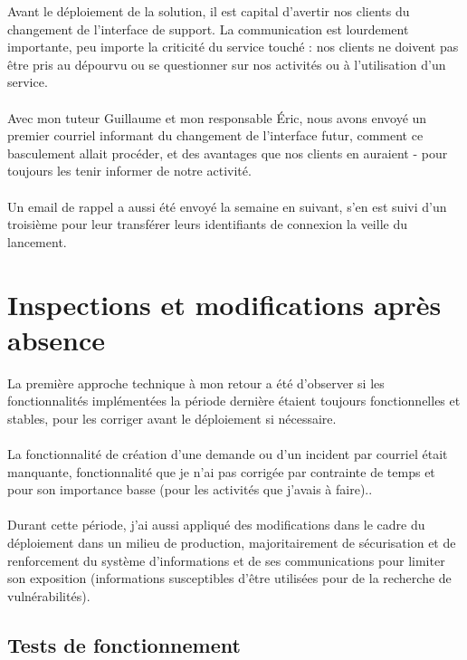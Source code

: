 Avant le déploiement de la solution, il est capital d'avertir nos clients du changement de l'interface de support. La communication est lourdement importante, peu importe la criticité du service touché : nos clients ne doivent pas être pris au dépourvu ou se questionner sur nos activités ou à l'utilisation d'un service.
\\ \\
Avec mon tuteur Guillaume et mon responsable Éric, nous avons envoyé un premier courriel informant du changement de l'interface futur, comment ce basculement allait procéder, et des avantages que nos clients en auraient - pour toujours les tenir informer de notre activité.
\\ \\
Un email de rappel a aussi été envoyé la semaine en suivant, s'en est suivi d'un troisième pour leur transférer leurs identifiants de connexion la veille du lancement.

\section{Inspections et modifications après absence}

La première approche technique à mon retour a été d'observer si les fonctionnalités implémentées la période dernière étaient toujours fonctionnelles et stables, pour les corriger avant le déploiement si nécessaire.
\\ \\
La fonctionnalité de création d'une demande ou d'un incident par courriel était manquante, fonctionnalité que je n'ai pas corrigée par contrainte de temps et pour son importance basse (pour les activités que j'avais à faire)..
\\ \\
Durant cette période, j'ai aussi appliqué des modifications dans le cadre du déploiement dans un milieu de production, majoritairement de sécurisation et de renforcement du système d'informations et de ses communications pour limiter son exposition (informations susceptibles d'être utilisées pour de la recherche de vulnérabilités).

\subsection{Tests de fonctionnement}


